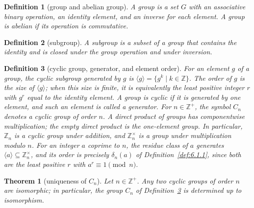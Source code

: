 \documentclass[11pt]{article}
\theoremstyle{ntstyle}
\newtheorem{theorem}{Theorem}[subsection]
\newtheorem{definition}{Definition}[subsection]
\newcommand{\ZmodUnits}[1]{\mathbb{Z}_{#1}^{\times}}
\begin{document}
\begin{definition}[group and abelian group]\label{def:6.6.1}
	A group is a set $G$ with an associative binary operation, an identity
	element, and an inverse for each element. A group is abelian if its
	operation is commutative.
\end{definition}
\begin{definition}[subgroup]\label{def:6.6.2}
	A subgroup is a subset of a group that contains the identity and is
	closed under the group operation and under inversion.
\end{definition}
\begin{definition}[cyclic group, generator, and element order]\label{def:6.6.3}
	For an element $g$ of a group, the cyclic subgroup generated by $g$ is
	$\langle g\rangle=\{g^k\mid k\in\mathbb{Z}\}$. The order of $g$ is the
	size of $\langle g\rangle$; when this size is finite, it is equivalently
	the least positive integer $r$ with $g^r$ equal to the identity element. A group is cyclic if it is
	generated by one element, and such an element is called a generator.
	For $n\in\mathbb{Z}^+$, the symbol $C_n$ denotes a cyclic group of order $n$.
	A direct product of groups has componentwise multiplication; the empty
	direct product is the one-element group.
	In particular, $\mathbb{Z}_n$ is a cyclic group under addition,
	and $\ZmodUnits{n}$ is a group under multiplication modulo $n$. For an
	integer $a$ coprime to $n$, the residue class of $a$ generates
	$\langle a\rangle\subseteq\ZmodUnits{n}$, and its order is precisely
	$\delta_n(a)$ of Definition~\ref{def:6.1.1}, since both are the least
	positive $r$ with $a^r\equiv1\pmod{n}$.
\end{definition}
\begin{theorem}[uniqueness of $C_n$]\label{thm:6.6.1}
	Let $n\in\mathbb{Z}^+$. Any two cyclic groups of order $n$ are isomorphic; in particular, the group
	$C_n$ of Definition~\ref{def:6.6.3} is determined up to isomorphism.
\end{theorem}
\end{document}
